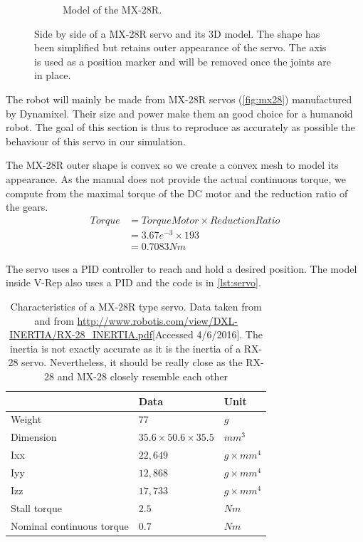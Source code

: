 \begin{figure}[htp]
\begin{subfigure}[b]{0.3\textwidth}
    \caption{Model of the MX-28R.}
    \label{fig:mx28_model}
\end{subfigure}
\caption[Side by side of a MX-28R servo and its 3D model]{Side by side of a MX-28R servo and its 3D model. The shape has been simplified but retains outer appearance of the servo. The axis is used as a position marker and will be removed once the joints are in place.}
\label{fig:servo}
\end{figure}

The robot will mainly be made from MX-28R servos (\cref{fig:mx28}) manufactured by Dynamixel. Their size and power make them an good choice for a humanoid robot. The goal of this section is thus to reproduce as accurately as possible the behaviour of this servo in our simulation. 

The MX-28R outer shape is convex so we create a convex mesh to model its appearance. As the manual \cite{mx_28_manual} does not provide the actual continuous torque, we compute from the maximal torque of the DC motor and the reduction ratio of the gears. 
\begin{align*}
Torque &= TorqueMotor \times ReductionRatio\\
&= 3.67e^{-3} \times 193\\
&= 0.7083Nm
\end{align*}

The servo uses a PID controller to reach and hold a desired position. The model inside V-Rep also uses a PID and the code is in \cref{lst:servo}.

\begin{table}[htp]
\begin{tabularx}{\textwidth}{@{} l l X @{}}
\toprule
& \textbf{Data} & \textbf{Unit}\\ 
\midrule
Weight & $77$ & $g$\\
Dimension & $35.6 \times 50.6 \times 35.5$ & $mm^3$\\
Ixx & $22,649$ & $g \times mm^4$\\
Iyy & $12,868$ & $g \times mm^4$\\
Izz & $17,733$ & $g \times mm^4$ \\
Stall torque & $2.5$ & $Nm$\\
Nominal continuous torque & $0.7$ & $Nm$\\
\bottomrule
\end{tabularx}
\caption[]{Characteristics of a MX-28R type servo. Data taken from \cite{mx_28_manual} and from \url{http://www.robotis.com/view/DXL-INERTIA/RX-28_INERTIA.pdf}[Accessed 4/6/2016]. The inertia is not exactly accurate as it is the inertia of a RX-28 servo. Nevertheless, it should be really close as the RX-28 and MX-28 closely resemble each other}
\label{table:specs}
\end{table} 


